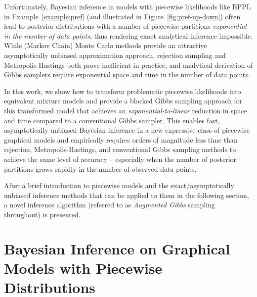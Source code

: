 \documentclass[letterpaper]{article}
\begin{document}
Unfortunately, Bayesian inference in models with piecewise likelihoods
like BPPL in Example~\ref{example:pref} (and illustrated in
Figure~\ref{fig:pref-up-down}) often lead to posterior distributions
with a number of piecewise partitions \emph{exponential in the number
  of data points}, thus rendering exact analytical
inference impossible.  While (Markov Chain) Monte Carlo methods
\cite{gilks2005markov}
provide an attractive asymptotically unbiased approximation approach,
rejection sampling and Metropolis-Hastings \cite{hastings1970monte} both prove inefficient in
practice, and analytical derivation of Gibbs samplers \cite{casella1992explaining} require
exponential space and time in the number of data points.

In this work, we show how to transform problematic
piecewise likelihoods into equivalent mixture models and provide
a blocked Gibbs sampling approach for this transformed model that
achieves an \emph{exponential-to-linear} reduction in space and time compared
to a conventional Gibbs sampler.  This enables fast, asymptotically
unbiased Bayesian inference in a new expressive class of piecewise graphical
models and empirically requires orders of magnitude less time than
rejection, Metropolis-Hastings, and conventional Gibbs sampling
methods to achieve the same level of accuracy -- especially
when the number of posterior partitions grows rapidly in the number of observed data points.

After a brief introduction to piecewise models and the
exact/asymptotically unbiased inference methods that can be applied to 
them in the following section, a novel inference 
algorithm (referred to as \emph{Augmented Gibbs} sampling throughout)
is presented.




\section{Bayesian Inference on Graphical Models with Piecewise Distributions}
\label{sec:inference_piecewise_models}
\end{document}
